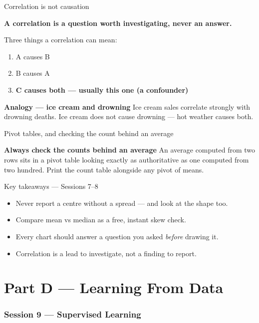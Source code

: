 \documentclass[10pt,aspectratio=169]{beamer}
\newcommand{\keyidea}[1]{%
  \begin{block}{}
  \centering\Large\bfseries\color{dsblue} #1
  \end{block}%
}
\newcommand{\trapbox}[2]{%
  \begin{alertblock}{\textbf{#1}}
  #2
  \end{alertblock}%
}
\newcommand{\analogybox}[2]{%
  \begin{exampleblock}{\textbf{Analogy --- #1}}
  #2
  \end{exampleblock}%
}
\begin{document}
\begin{frame}{Correlation is not causation}
\keyidea{A correlation is a question worth investigating, never an answer.}
\vspace{0.3cm}
Three things a correlation can mean:
\begin{enumerate}
\item A causes B
\item B causes A
\item \textbf{C causes both --- usually this one (a confounder)}
\end{enumerate}
\vspace{0.2cm}
\analogybox{ice cream and drowning}{Ice cream sales correlate strongly with drowning deaths. Ice cream does not cause drowning --- hot weather causes both.}
\end{frame}

\begin{frame}{Pivot tables, and checking the count behind an average}
\trapbox{Always check the counts behind an average}{An average computed from two rows sits in a pivot table looking exactly as authoritative as one computed from two hundred. Print the count table alongside any pivot of means.}
\end{frame}

\begin{frame}{Key takeaways --- Sessions 7--8}
\begin{itemize}
\item Never report a centre without a spread --- and look at the shape too.
\item Compare mean vs median as a free, instant skew check.
\item Every chart should answer a question you asked \emph{before} drawing it.
\item Correlation is a lead to investigate, not a finding to report.
\end{itemize}
\end{frame}

\part{Part D --- Learning From Data}
\frame{\partpage}

\section{Session 9 --- Supervised Learning}
\end{document}
